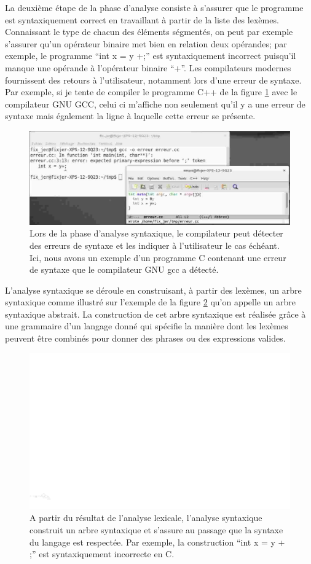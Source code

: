 La deuxième étape de la phase d'analyse consiste à s'assurer que le programme est syntaxiquement correct en travaillant à partir de la liste des lexèmes. Connaissant le type de chacun des éléments ségmentés, on peut par exemple s'assurer qu'un opérateur binaire met bien en relation deux opérandes; par exemple, le programme ``int x = y +;'' est syntaxiquement incorrect puisqu'il manque une opérande à l'opérateur binaire ``+''. Les compilateurs modernes fournissent des retours à l'utilisateur, notamment lors d'une erreur de syntaxe. Par exemple, si je tente de compiler le programme C++ de la figure \ref{fig:erreur_syntaxe} avec le compilateur GNU GCC, celui ci m'affiche non seulement qu'il y a une erreur de syntaxe mais également la ligne à laquelle cette erreur se présente.

\begin{figure}[htbp]
\centering\includegraphics[width=0.6\linewidth]{Figs/erreur_syntaxe.pdf}
\caption{\label{fig:erreur_syntaxe} Lors de la phase d'analyse syntaxique, le compilateur peut détecter des erreurs de syntaxe et les indiquer à l'utilisateur le cas échéant. Ici, nous avons un exemple d'un programme C contenant une erreur de syntaxe que le compilateur GNU gcc a détecté.}
\end{figure}


L'analyse syntaxique se déroule en construisant, à partir des lexèmes, un arbre syntaxique comme illustré sur l'exemple de la figure \ref{fig:syntactic_tree} qu'on appelle un arbre syntaxique abstrait. La construction de cet arbre syntaxique est réalisée grâce à une grammaire d'un langage donné qui spécifie la manière dont les lexèmes peuvent être combinés pour donner des phrases ou des expressions valides.

\begin{figure}[htbp]
\includegraphics[width=\linewidth]{Figs/syntactic_tree.pdf}
\caption{\label{fig:syntactic_tree} A partir du résultat de l'analyse lexicale, l'analyse syntaxique construit un arbre syntaxique et s'assure au passage que la syntaxe du langage est respectée. Par exemple, la construction ``int x = y + ;'' est syntaxiquement incorrecte en C.}
\end{figure}

